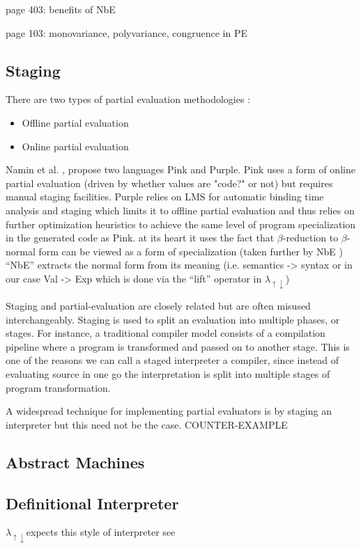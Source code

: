 \documentclass{article}
\theoremstyle{definition}
\newcommand{\mslang}{$\lambda_{\uparrow\downarrow}$}
\begin{document}
page 403: benefits of NbE

\cite{jones1993partial} page 103: monovariance, polyvariance, congruence in PE

\subsection{Staging}
There are two types of partial evaluation methodologies \cite{jones1993partial}:
\begin{itemize}
	\item Offline partial evaluation
	\item Online partial evaluation \cite{cook2011tutorial}
\end{itemize}
Namin et al. \cite{amin2017collapsing}, propose two languages Pink and Purple. Pink uses a form of online partial evaluation (driven by whether values are "code?" or not) but requires manual staging facilities. Purple relies on LMS for automatic binding time analysis and staging
which limits it to offline partial evaluation and thus relies on further optimization heuristics to achieve the same level of program specialization in the generated code as Pink.
at its heart it uses the fact that $\beta$-reduction to $\beta$-normal form can be viewed as a form of specialization (taken further by NbE \cite{berger1991inverse,berger1998normalization})
``NbE'' extracts the normal form from its meaning (i.e. semantics -> syntax or in our case Val -> Exp which is done via the ``lift'' operator in \mslang)

Staging and partial-evaluation are closely related but are often misused interchangeably. Staging is used to split an evaluation into multiple phases, or stages. For instance, a traditional compiler model consists of a compilation pipeline where a program is transformed and passed on to another stage. This is one of the reasons we can call a staged interpreter a compiler, since instead of evaluating source in one go the interpretation is split into multiple stages of program transformation.

A widespread technique for implementing partial evaluators is by staging an interpreter but this need not be the case. COUNTER-EXAMPLE

\subsection{Abstract Machines}

\subsection{Definitional Interpreter}
\mslang expects this style of interpreter
see \cite{reynolds1972definitional}
\end{document}
